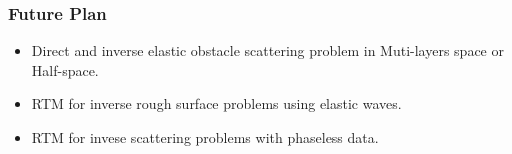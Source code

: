 \documentclass[utf-8,8pt]{beamer}
\begin{document}
\begin{frame}
\frametitle{Future Plan}
\begin{itemize}
\item Direct and inverse elastic obstacle scattering problem in Muti-layers space or Half-space.
\item RTM for inverse rough surface problems using elastic waves.
\item RTM for invese scattering problems with phaseless data.
\end{itemize}
\end{frame}

%
\end{document}
